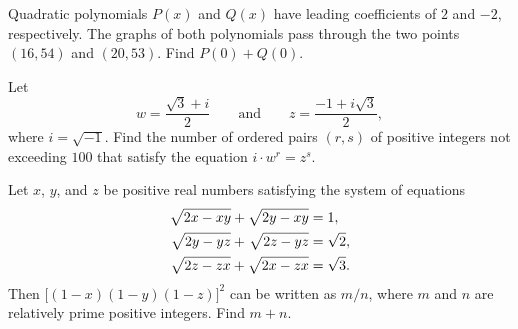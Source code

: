 \begin{question}[name={2022 AIME I, \href{https://artofproblemsolving.com/community/c4p24368517}{Problem 1}}]
	Quadratic polynomials $P(x)$ and $Q(x)$ have leading coefficients of $2$ and $-2$, respectively. The graphs of both polynomials pass through the two points $(16,54)$ and $(20,53)$. Find ${P(0) + Q(0)}$.	
\end{question}


%	













\begin{question}[name={2022 AIME I, \href{https://artofproblemsolving.com/community/c4p24368559}{Problem 4}}]
	Let $$w = \frac{\sqrt{3}+i}{2} \qquad \text{and} \qquad z=\frac{-1+i\sqrt{3}}{2},$$ where $i=\sqrt{-1}$. Find the number of ordered pairs $(r, s)$ of positive integers not exceeding $100$ that satisfy the equation $i\cdot w^r=z^s$.	
	
\end{question}


%	












\begin{question}[name={2022 AIME I, \href{https://artofproblemsolving.com/community/c4p24368532}{Problem 15}}]
	Let $x$, $y$, and $z$ be positive real numbers satisfying the system of equations
	\begin{align*}
		\sqrt{2x - xy} + \sqrt{2y - xy} & = 1,\\
		\sqrt{2y - yz} + \hspace{0.1em} \sqrt{2z - yz} & = \sqrt{2},\\
		\sqrt{2z - zx\vphantom{y}} + \sqrt{2x - zx\vphantom{y}} & = \sqrt{3}.
	\end{align*}Then $\big[ (1-x)(1-y)(1-z) \big] ^2$ can be written as ${m}/{n}$, where $m$ and $n$ are relatively prime positive integers. Find $m+n$.
\end{question}


